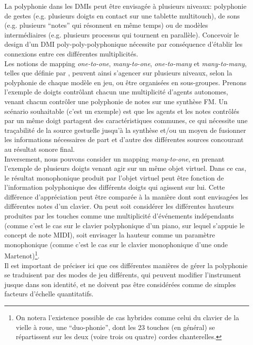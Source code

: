\noindent La polyphonie dans les \glspl{DMI} peut être envisagée à plusieurs niveaux: polyphonie de gestes (e.g. plusieurs doigts en contact sur une tablette multitouch), de sons (e.g. plusieurs ``notes'' qui résonnent en même temps) ou de modèles intermédiaires (e.g. plusieurs processus qui tournent en parallèle). Concevoir le design d'un \gls{DMI} poly-poly-polyphonique nécessite par conséquence d'établir les connexions entre ces différentes multiplicités.\\
\indent Les notions de mapping \textit{one-to-one}, \textit{many-to-one}, \textit{one-to-many} et \textit{many-to-many}, telles que définie par \cite{hunt_mapping_2002}, peuvent ainsi s'agencer sur plusieurs niveaux, selon la polyphonie de chaque modèle en jeu, ou être organisées en sous-groupes. Prenons l'exemple de doigts contrôlant chacun une multiplicité d'agents autonomes, venant chacun contrôler une polyphonie de notes sur une synthèse \gls{FM}. Un scénario souhaitable (c'est un exemple) est que les agents et les notes contrôlés par un même doigt partagent des caractéristiques communes, ce qui nécessite une traçabilité de la source gestuelle jusqu'à la synthèse et/ou un moyen de fusionner les informations nécessaires de part et d'autre des différentes sources concourant au résultat sonore final.\\
\indent Inversement, nous pouvons consider un mapping \textit{many-to-one}, en prenant l'exemple de plusieurs doigts venant agir sur un même objet virtuel. Dans ce cas, le résultat monophonique produit par l'objet virtuel peut être fonction de l'information polyphonique des différents doigts qui agissent sur lui. Cette différence d'appréciation peut être comparée à la manière dont sont envisagées les différentes notes d'un clavier. On peut soit considérer les différentes hauteurs produites par les touches comme une multiplicité d'événements indépendants (comme c'est le cas sur le clavier polyphonique d'un piano, sur lequel s'appuie le concept de note \gls{MIDI}), soit envisager la hauteur comme un paramètre monophonique (comme c'est le cas sur le clavier monophonique d'une onde Martenot)\footnote{On notera l'existence possible de cas hybrides comme celui du clavier de la vielle à roue, une ``duo-phonie'', dont les 23 touches (en général) se répartissent sur les deux (voire trois ou quatre) cordes chanterelles.}.\\
\indent Il est important de préciser ici que ces différentes manières de gérer la polyphonie se traduisent par des modes de jeu différents, qui peuvent modifier l'instrument jusque dans son identité, et ne doivent pas être considérées comme de simples facteurs d'échelle quantitatifs.

